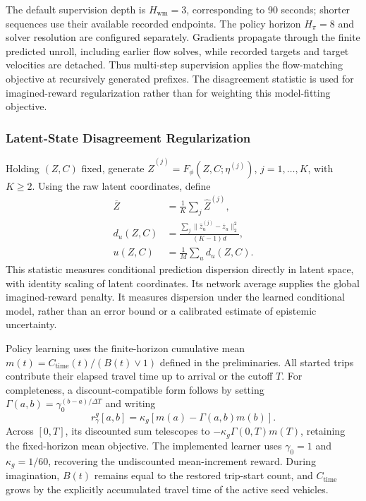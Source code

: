 The default supervision depth is $H_{\mathrm{wm}}=3$, corresponding to
90 seconds; shorter sequences use their available recorded endpoints.
The policy horizon $H_\pi=8$ and solver resolution are configured
separately. Gradients propagate through the finite predicted unroll,
including earlier flow solves, while recorded targets and target
velocities are detached. Thus multi-step supervision applies the
flow-matching objective at recursively generated prefixes. The
disagreement statistic is used for imagined-reward regularization rather
than for weighting this model-fitting objective.

\subsubsection{Latent-State Disagreement Regularization}
\label{sec:global-return}

Holding $(Z,C)$ fixed, generate
$\widehat Z^{(j)}=F_\phi(Z,C;\eta^{(j)})$, $j=1,\ldots,K$,
with $K\ge2$. Using the raw latent coordinates, define
\begin{equation}
 \begin{aligned}
 \overline Z&=\frac1K\sum_j\widehat Z^{(j)},\\
 d_u(Z,C)&=\frac{\sum_j
       \|\widehat z_u^{(j)}-\overline z_u\|_2^2}{(K-1)d},\\
 u(Z,C)&=\frac1M\sum_u d_u(Z,C).
 \end{aligned}
 \label{eq:latent-disagreement}
\end{equation}
This statistic measures conditional prediction dispersion directly in
latent space, with identity scaling of latent coordinates. Its network
average supplies the global imagined-reward penalty. It measures
dispersion under the learned conditional model, rather than an error bound
or a calibrated estimate of epistemic uncertainty.

Policy learning uses the finite-horizon cumulative mean
$m(t)=C_{\mathrm{time}}(t)/(B(t)\vee1)$ defined in the preliminaries.
All started trips contribute their elapsed travel time up to arrival or
the cutoff $T$. For completeness, a discount-compatible form follows by
setting $\Gamma(a,b)=\gamma_0^{(b-a)/\Delta T}$ and writing
\begin{equation}
 r_\gamma^g[a,b]=\kappa_g[m(a)-\Gamma(a,b)m(b)].
 \label{eq:method-global-reward}
\end{equation}
Across $[0,T]$, its discounted sum telescopes to
$-\kappa_g\Gamma(0,T)m(T)$, retaining the fixed-horizon mean objective.
The implemented learner uses $\gamma_0=1$ and $\kappa_g=1/60$, recovering
the undiscounted mean-increment reward. During imagination, $B(t)$ remains
equal to the restored trip-start count, and $C_{\mathrm{time}}$ grows by
the explicitly accumulated travel time of the active seed vehicles.

